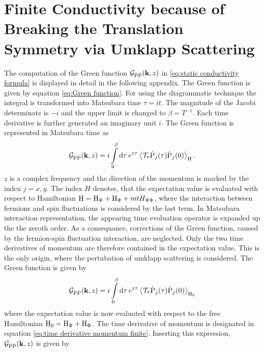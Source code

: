 %
%
\chapter{Finite Conductivity because of Breaking the Translation Symmetry via Umklapp Scattering}
\label{appch:finite conductivity because of breaking the translation symmetry via umklapp scattering}
%
%
The computation of the Green function $\mathcal{G}_{\dot{\mathrm{P}}\dot{\mathrm{P}}}(\vb{k}, z)$ in \eqref{eq:static conductivity formula} is displayed in detail in the following appendix.
The Green function is given by equation \eqref{eq:Green function}.
For using the diagrammatic technique the integral is transformed into Matsubara time $\tau = it$.
The magnitude of the Jacobi determinate is $-i$ and the upper limit is changed to $\beta = T^{-1}$.
Each time derivative is further generated an imaginary unit $i$.
The Green function is represented in Matsubara time as
%
\begin{align}
	\mathcal{G}_{\dot{\mathrm{P}}\dot{\mathrm{P}}}(\vb{k}, z) = i \int\limits_{0}^{\beta} \dd{\tau} e^{z \tau} \expval{\mathcal{T}_{\tau} \dot{\mathrm{P}}_{j}(\tau) \dot{\mathrm{P}}_{j}(0)}_{\mathrm{H}}.
\end{align}
%
$z$ is a complex frequency and the direction of the momentum is marked by the index $j = x,y$.
The index $H$ denotes, that the expectation value is evaluated with respect to Hamiltonian $\mathrm{H} = \mathrm{H}_{\Psi} + \mathrm{H}_{\Phi} + mt{H}_{\Psi\Phi}$, where the interaction between fermions and spin fluctuations is considered by the last term.
In Matsubara interaction representation, the appearing time evoluation operator is expanded up the the zeroth order.
As a consequance, corrections of the Green function, caused by the fermion-spin fluctuation interaction, are neglected.
Only the two time derivatives of momentum are therefore contained in the expectation value.
This is the only origin, where the pertubation of umklapp scattering is considered.
The Green function is given by
%
\begin{align}
	\mathcal{G}_{\dot{\mathrm{P}}\dot{\mathrm{P}}}(\vb{k}, z) = i \int\limits_{0}^{\beta} \dd{\tau} e^{z \tau} \expval{\mathcal{T}_{\tau} \dot{\mathrm{P}}_{j}(\tau) \dot{\mathrm{P}}_{j}(0)}_{\mathrm{H}_{0}}
\end{align}
%
where the expectation value is now evaluated with respect to the free Hamiltonian $\mathrm{H}_{0} = \mathrm{H}_{\Psi} + \mathrm{H}_{\Phi}$.
The time derivative of momentum is designated in equation \eqref{eq:time derivative momentum finite}.
Inserting this expression, $\mathcal{G}_{\dot{\mathrm{P}}\dot{\mathrm{P}}}(\vb{k}, z)$ is given by
